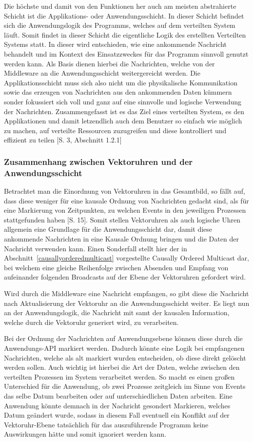  Die höchste und damit von den Funktionen her auch am meisten abstrahierte Schicht ist die Applikations- oder Anwendungsschicht. In dieser Schicht befindet sich die Anwendungslogik des Programms, welches auf dem verteilten System läuft. Somit findet in dieser Schicht die eigentliche Logik des erstellten Verteilten Systems statt. In dieser wird entschieden, wie eine ankommende Nachricht behandelt und im Kontext des Einsatzzweckes für das Programm sinnvoll genutzt werden kann. Als Basis dienen hierbei die Nachrichten, welche von der Middleware an die Anwendungsschicht weitergereicht werden. Die Applikationsschicht muss sich also nicht um die physikalische Kommunikation sowie das erzeugen von Nachrichten aus den ankommenden Daten kümmern sonder fokussiert sich voll und ganz auf eine sinnvolle und logische Verwendung der Nachrichten.
 Zusammengefasst ist es das Ziel eines verteilten System, es den Applikationen und damit letzendlich auch dem Benutzer so einfach wie möglich zu machen, auf verteilte Ressourcen zuzugreifen und diese kontrolliert und effizient zu teilen \cite{Tanenbaum2007}[S. 3, Abschnitt 1.2.1]

\subsubsection{Zusammenhang zwischen Vektoruhren und der Anwendungsschicht}
Betrachtet man die Einordnung von Vektoruhren in das Gesamtbild, so fällt auf, dass diese weniger für eine kausale Ordnung von Nachrichten gedacht sind, als für eine Markierung von Zeitpunkten, zu welchen Events in den jeweiligen Prozessen stattgefunden haben \cite{bibid}[S. 15]. Somit stellen Vektoruhren als auch logische Uhren allgemein eine Grundlage für die Anwendungsschicht dar, damit diese ankommende Nachrichten in eine Kausale Ordnung bringen und die Daten der Nachricht verwenden kann. Einen Sonderfall stellt hier der in Abschnitt~\ref{causallyorderedmulticast} vorgestellte Causally Ordered Multicast dar, bei welchem eine gleiche Reihenfolge zwischen Absenden und Empfang von aufeinander folgenden Broadcasts auf der Ebene der Vektoruhren gefordert wird.

Wird durch die Middleware eine Nachricht empfangen, so gibt diese die Nachricht nach Aktualisierung der Vektoruhr an die Anwendungsschicht weiter. Es liegt nun an der Anwendungslogik, die Nachricht mit samt der kausalen Information, welche durch die Vektoruhr generiert wird, zu verarbeiten. 

Bei der Ordnung der Nachrichten auf Anwendungsebene können diese durch die Anwendungs-API markiert werden. Dadurch könnte eine Logik bei empfangenen Nachrichten, welche als alt markiert wurden entscheiden, ob diese direkt gelöscht werden sollen. Auch wichtig ist hierbei die Art der Daten, welche zwischen den verteilten Prozessen im System verarbeitet werden. So macht es einen großen Unterschied für die Anwendung, ob zwei Prozesse zeitgleich im Sinne von Events das selbe Datum bearbeiten oder auf unterschiedlichen Daten arbeiten. Eine Anwendung könnte demnach in der Nachricht gesondert Markieren, welches Datum geändert wurde, sodass in diesem Fall eventuell ein Konflikt auf der Vektoruhr-Ebene tatsächlich für das auszuführende Programm keine Auswirkungen hätte und somit ignoriert werden kann.